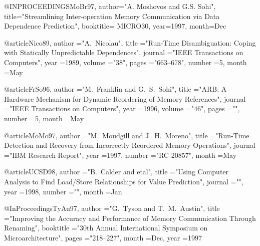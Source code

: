 @INPROCEEDINGS{MoBr97,
  author="A. Moshovos and G.S. Sohi",
  title="Streamlining Inter-operation Memory Communication via Data Dependence Prediction",
  booktitle= MICRO30,
  year=1997,
  month=Dec
}



@article{Nico89,
        author  ="A.~Nicolau",
        title   ="Run-Time Disambiguation: Coping with Statically
                  Unpredictable Dependences",
        journal ="IEEE Transactions on Computers",
        year    =1989,
        volume  ="38",
        pages   ="663--678",
        number  =5,
        month   =May
}

@article{FrSo96,
        author  ="M.~Franklin and G.~S.~Sohi",
        title   ="ARB: A Hardware Mechanism for Dynamic Reordering of
                  Memory References",
        journal ="IEEE Transactions on Computers",
        year    =1996,
        volume  ="46",
        pages   ="",
        number  =5,
        month   =May
}


@article{MoMo97,
        author  ="M.~Moudgill and J.~H.~Moreno",
        title   ="Run-Time Detection and Recovery from Incorrectly Reordered
                  Memory Operations",
        journal ="IBM Research Report",
        year    =1997,
        number  ="RC 20857",
        month   =May
}

@article{UCSD98,
        author  ="B.~Calder and etal",
        title   ="Using Computer Analysis to Find Load/Store Relationships
                 for Value Prediction",
        journal ="",
        year    =1998,
        number  ="",
        month   =Jan
}

@InProceedings{TyAu97,
        author          ="G.~Tyson and T.~M.~Austin",
        title           ="Improving the Accuracy and Performance of
                          Memory Communication Through Renaming",
        booktitle       ="30th Annual International Symposium on
                          Microarchitecture",
        pages           ="218--227",
        month           =Dec,
        year            =1997
}


